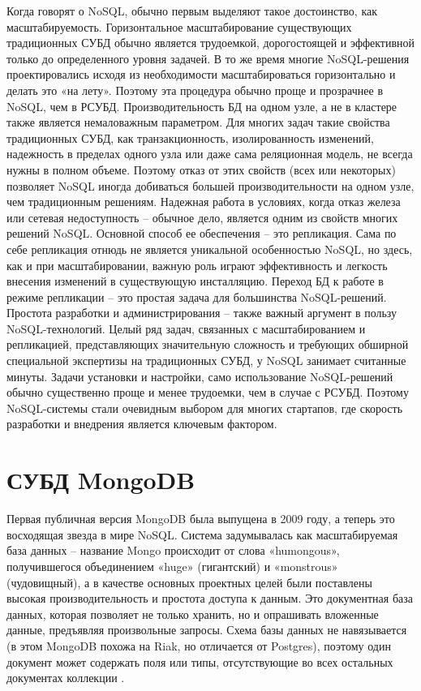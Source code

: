 \documentclass[14pt]{extreport}
\begin{document}
Когда говорят о NoSQL, обычно первым выделяют такое достоинство, как масштабируемость. Горизонтальное масштабирование существующих традиционных СУБД обычно является трудоемкой, дорогостоящей и эффективной только до определенного уровня задачей. В то же время многие NoSQL-решения проектировались исходя из необходимости масштабироваться горизонтально и делать это «на лету». Поэтому эта процедура обычно проще и прозрачнее в NoSQL, чем в РСУБД. Производительность БД на одном узле, а не в кластере также является немаловажным параметром. Для многих задач такие свойства традиционных СУБД, как транзакционность, изолированность изменений, надежность в пределах одного узла или даже сама реляционная модель, не всегда нужны в полном объеме. Поэтому отказ от этих свойств (всех или некоторых) позволяет NoSQL иногда добиваться большей производительности на одном узле, чем традиционным решениям. Надежная работа в условиях, когда отказ железа или сетевая недоступность – обычное дело, является одним из свойств многих решений NoSQL. Основной способ ее обеспечения – это репликация. Сама по себе репликация отнюдь не является уникальной особенностью NoSQL, но здесь, как и при масштабировании, важную роль играют эффективность и легкость внесения изменений в существующую инсталляцию. Переход БД к работе в режиме репликации – это простая задача для большинства NoSQL-решений. Простота разработки и администрирования – также важный аргумент в пользу NoSQL-технологий.
Целый ряд задач, связанных с масштабированием и репликацией, представляющих значительную сложность и требующих обширной специальной экспертизы на традиционных СУБД, у NoSQL занимает считанные минуты. Задачи установки и настройки, само использование NoSQL-решений обычно существенно проще и менее трудоемки, чем в случае с РСУБД. Поэтому NoSQL-системы стали очевидным выбором для многих стартапов, где скорость разработки и внедрения является ключевым фактором.

\section{СУБД MongoDB}
Первая публичная версия MongoDB была выпущена в 2009 году, а теперь это восходящая звезда в мире NoSQL. Система задумывалась как масштабируемая база данных – название Mongo происходит от слова «humongous», получившегося объединением «huge» (гигантский) и «monstrous» (чудовищный), а в качестве основных проектных целей были поставлены высокая производительность и простота доступа к данным. Это документная база данных, которая позволяет не только хранить, но и опрашивать вложенные данные, предъявляя произвольные запросы. Схема базы данных не навязывается (в этом MongoDB похожа на Riak, но отличается от Postgres), поэтому один
документ может содержать поля или типы, отсутствующие во всех остальных документах коллекции \cite{mongodb}.
\end{document}
